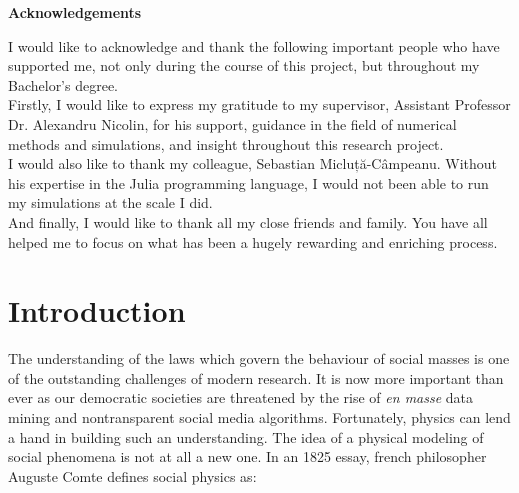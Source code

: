 \documentclass[12pt,openright,twoside]{book}
\begin{document}
\begin{center}

{\LARGE \textbf{Acknowledgements}}

\end{center}

\vspace{36pt}
I would like to acknowledge and thank the following important people who have supported me, not only during the course of this project, but throughout my Bachelor's degree.\\

Firstly, I would like to express my gratitude to my supervisor, Assistant Professor Dr. Alexandru Nicolin, for his support, guidance in the field of numerical methods and simulations, and insight throughout this research project.\\

I would also like to thank my colleague, Sebastian
Micluță-Câmpeanu. Without his expertise in the Julia programming language, I would not been able to run my simulations at the scale I did.\\

And finally, I would like to thank all my close friends and family. You have all helped me to focus on what has been a hugely rewarding and enriching process.\\

\vspace{40pt}

\vspace*{\fill}
\newpage
\thispagestyle{empty} \vspace*{\fill} \tableofcontents

\setlength\parindent{0pt}



\setcounter{page}{0}


\newpage



\chapter{Introduction}
\label{intro}

The understanding of the laws which govern the behaviour of social masses is one of the outstanding challenges of modern research. It is now more important than ever as our democratic societies are threatened by the rise of \textit{en masse} data mining and nontransparent social media algorithms\cite{o'neil_2016}. Fortunately, physics can lend a hand in building such an understanding. The idea of a physical modeling of social phenomena is not at all a new one. In an 1825 essay, french philosopher Auguste Comte defines social physics as:\\
\end{document}
